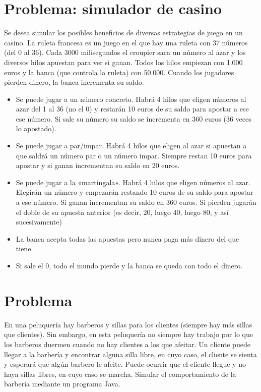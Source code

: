 \documentclass[letterpaper,10pt,spanish]{sphinxmanual}
\begin{document}
\section{Problema: simulador de casino}
\label{\detokenize{textos/tema2:problema-simulador-de-casino}}
Se desea simular los posibles beneficios de diversas estrategias de juego en un casino. La ruleta francesa es un juego en el que hay una ruleta con 37 números (del 0 al 36). Cada 3000 milisegundos el croupier saca un número al azar y los diversos hilos apuestan para ver si ganan. Todos los hilos empiezan con 1.000 euros y la banca (que controla la ruleta) con 50.000. Cuando los jugadores pierden dinero, la banca incrementa su saldo.
\begin{itemize}
\item {} 
Se puede jugar a un número concreto. Habrá 4 hilos que eligen números al azar del 1 al 36 (no el 0) y restarán 10 euros de su saldo para apostar a ese ese número. Si sale su número su saldo se incrementa en 360 euros (36 veces lo apostado).

\item {} 
Se puede jugar a par/impar. Habrá 4 hilos que eligen al azar si apuestan a que saldrá un número par o un número impar. Siempre restan 10 euros para apostar y si ganan incrementan su saldo en 20 euros.

\item {} 
Se puede jugar a la «martingala». Habrá 4 hilos que eligen números al azar. Elegirán un número y empezarán restando 10 euros de su saldo para apostar a ese número. Si ganan incrementan su saldo en 360 euros. Si pierden jugarán el doble de su apuesta anterior (es decir, 20, luego 40, luego 80, y así sucesivamente)

\item {} 
La banca acepta todas las apuestas pero nunca paga más dinero del que tiene.

\item {} 
Si sale el 0, todo el mundo pierde y la banca se queda con todo el dinero.

\end{itemize}


\section{Problema}
\label{\detokenize{textos/tema2:id1}}
En una peluquería hay barberos y sillas para los clientes (siempre hay más sillas que clientes). Sin embargo, en esta peluquería no siempre hay trabajo por lo que los barberos duermen cuando no hay clientes a los que afeitar. Un cliente puede llegar a la barbería y encontrar alguna silla libre, en cuyo caso, el cliente se sienta y esperará que algún barbero le afeite. Puede ocurrir que el cliente llegue y no haya sillas libres, en cuyo caso se marcha. Simular el comportamiento de la barbería mediante un programa Java.
\end{document}

